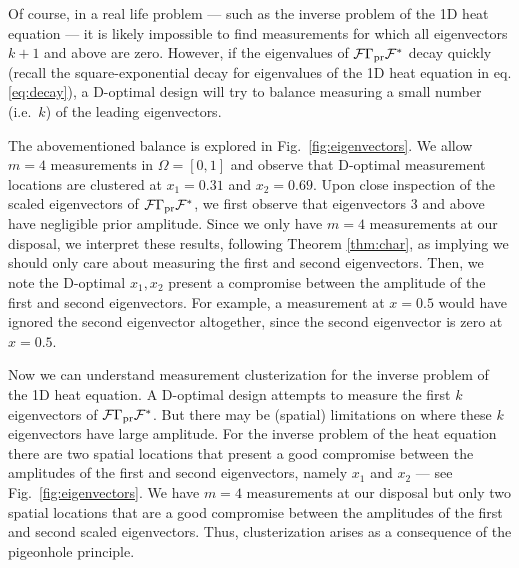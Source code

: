 Of course, in a real life problem --- such as the inverse problem of
the 1D heat equation --- it is likely impossible to find measurements
for which all eigenvectors $k+1$ and above are zero. However, if the
eigenvalues of $\mathcal{F}\Gamma_{\textup{pr}}\mathcal{F}^*$ decay quickly (recall the
square-exponential decay for eigenvalues of the 1D heat equation in
eq.\eqref{eq:decay}), a D-optimal design will try to balance measuring
a small number (i.e.~$k$) of the leading eigenvectors.

The abovementioned balance is explored in
Fig.~\ref{fig:eigenvectors}. We allow $m=4$ measurements in $\Omega =
[0,1]$ and observe that D-optimal measurement locations are clustered
at $x_1 = 0.31$ and $x_2 = 0.69$. Upon close inspection of the scaled
eigenvectors of $\mathcal{F} \Gamma_{\textup{pr}} \mathcal{F}^*$, we first observe that
eigenvectors $3$ and above have negligible prior amplitude. Since we
only have $m=4$ measurements at our disposal, we interpret these
results, following Theorem \ref{thm:char}, as implying we should only
care about measuring the first and second eigenvectors. Then, we note
the D-optimal $x_1,x_2$ present a compromise between the amplitude of
the first and second eigenvectors. For example, a measurement at
$x=0.5$ would have ignored the second eigenvector altogether, since
the second eigenvector is zero at $x=0.5$.

Now we can understand measurement clusterization for the inverse
problem of the 1D heat equation. A D-optimal design attempts to
measure the first $k$ eigenvectors of $\mathcal{F} \Gamma_{\textup{pr}} \mathcal{F}^*$. But there
may be (spatial) limitations on where these $k$ eigenvectors have
large amplitude. For the inverse problem of the heat equation there
are two spatial locations that present a good compromise between the
amplitudes of the first and second eigenvectors, namely $x_1$ and
$x_2$ --- see Fig.~\ref{fig:eigenvectors}. We have $m=4$ measurements
at our disposal but only two spatial locations that are a good
compromise between the amplitudes of the first and second scaled
eigenvectors. Thus, clusterization arises as a consequence of the
pigeonhole principle.

